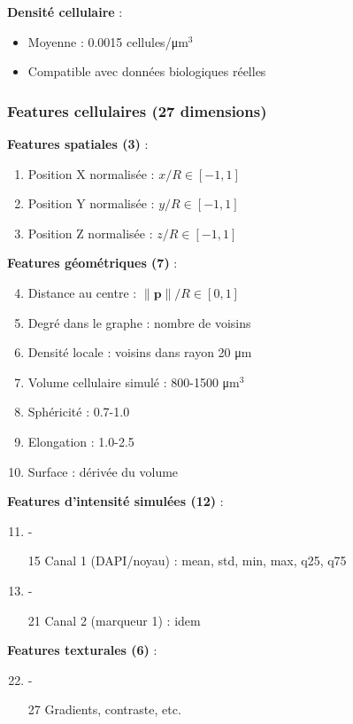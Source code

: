 \textbf{Densité cellulaire} :
\begin{itemize}
    \item Moyenne : 0.0015 cellules/μm$^3$
    \item Compatible avec données biologiques réelles
\end{itemize}

\subsubsection{Features cellulaires (27 dimensions)}

\textbf{Features spatiales (3)} :
\begin{enumerate}
    \item Position X normalisée : $x / R \in [-1, 1]$
    \item Position Y normalisée : $y / R \in [-1, 1]$
    \item Position Z normalisée : $z / R \in [-1, 1]$
\end{enumerate}

\textbf{Features géométriques (7)} :
\begin{enumerate}
    \setcounter{enumi}{3}
    \item Distance au centre : $\|\mathbf{p}\| / R \in [0, 1]$
    \item Degré dans le graphe : nombre de voisins
    \item Densité locale : voisins dans rayon 20 μm
    \item Volume cellulaire simulé : 800-1500 μm$^3$
    \item Sphéricité : 0.7-1.0
    \item Elongation : 1.0-2.5
    \item Surface : dérivée du volume
\end{enumerate}

\textbf{Features d'intensité simulées (12)} :
\begin{enumerate}
    \setcounter{enumi}{10}
    \item-\item[15] Canal 1 (DAPI/noyau) : mean, std, min, max, q25, q75
    \item-\item[21] Canal 2 (marqueur 1) : idem
\end{enumerate}

\textbf{Features texturales (6)} :
\begin{enumerate}
    \setcounter{enumi}{21}
    \item-\item[27] Gradients, contraste, etc.
\end{enumerate}


